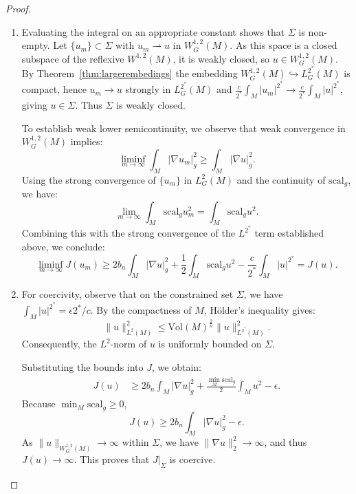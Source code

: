 \documentclass[12pt,a4paper]{amsart}
\theoremstyle{plain}
\theoremstyle{definition}
\theoremstyle{remark}
\newcommand{\ga}{\mathit{g}} %
\begin{document}
\begin{proof}
\begin{enumerate}
        \item Evaluating the integral on an appropriate constant shows that $\Sigma$ is non-empty. Let $\{u_m\}\subset\Sigma$ with $u_m\rightharpoonup u$ in $W^{1,2}_G(M)$. As this
space is a closed subspace of the reflexive $W^{1,2}(M)$, it is weakly closed, so
$u\in W^{1,2}_G(M)$. By Theorem~\ref{thm:largerembedings} the embedding
$W^{1,2}_G(M)\hookrightarrow L^{2^*}_G(M)$ is compact, hence $u_m\to u$ strongly
in $L^{2^*}_G(M)$ and $\frac{c}{2^*}\int_M|u_m|^{2^*}\to\frac{c}{2^*}\int_M|u|^{2^*}$,
giving $u\in\Sigma$. Thus $\Sigma$ is weakly closed.
        
    
        To establish weak lower semicontinuity, we observe that weak convergence in $W^{1,2}_G(M)$ implies:
        $$\liminf_{m\to\infty}\int_M|\nabla u_m|^2_{\ga} \geq \int_M|\nabla u|^2_{\ga}.$$
        Using the strong convergence of $\{u_m\}$ in $L^2_G(M)$ and the continuity of $\mathrm{scal}_{\ga}$, we have:
        $$\lim_{m\to\infty} \int_M \mathrm{scal}_{\ga}u_m^2 = \int_M \mathrm{scal}_{\ga}u^2.$$
        Combining this with the strong convergence of the $L^{2^*}$ term established above, we conclude:
        $$\liminf_{m\to\infty}J(u_m) \geq 2b_n\int_M|\nabla u|^2_{\ga} +\frac{1}{2}\int_M\mathrm{scal}_{\ga}u^2-\frac{c}{2^*}\int_M|u|^{2^*} = J(u).$$
        
    \item For coercivity, observe that on the constrained set $\Sigma$, we have $\int_M |u|^{2^*} = \epsilon 2^* / c$. By the compactness of $M$, Hölder's inequality gives:
        $$\|u\|_{L^2(M)}^2 \leq \mathrm{Vol}(M)^{\frac{2}{n}} \|u\|_{L^{2^*}(M)}^2.$$
        Consequently, the $L^2$-norm of $u$ is uniformly bounded on $\Sigma$.
        
        Substituting the bounds into $J$, we obtain:
        \begin{align}\label{eq:inequality1}
            J(u) &\geq 2b_n\int_M|\nabla u|_{\ga}^2 + \frac{\min_M\mathrm{scal}_{\ga}}{2}\int_Mu^2 - \epsilon.
        \end{align}
        Because $\min_M \mathrm{scal}_{\ga} \geq 0$, 
        $$J(u) \geq 2b_n\int_M|\nabla u|_{\ga}^2 - \epsilon.$$
        As $\|u\|_{W_G^{1,2}(M)} \to \infty$ within $\Sigma$, we have $\|\nabla u\|_2^2 \to \infty$, and thus $J(u) \to \infty$. This proves that $J|_{\Sigma}$ is coercive. \qedhere
    \end{enumerate}
\end{proof}
\end{document}
